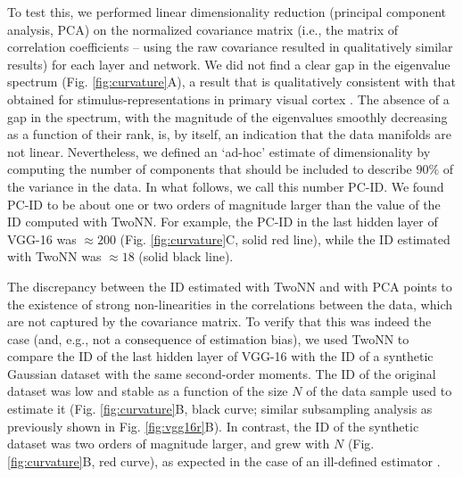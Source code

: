 \documentclass{article}
\begin{document}
To test this, we performed linear dimensionality reduction (principal component analysis, PCA) on the normalized covariance matrix (i.e., the matrix of correlation coefficients -- using the raw covariance resulted in qualitatively similar results) for each layer and network. We did not find a clear gap in the eigenvalue spectrum (Fig. \ref{fig:curvature}A), a  result that is qualitatively consistent with that obtained for stimulus-representations in primary visual cortex \cite{stringer2018high}. The absence of a gap in the spectrum, with the magnitude of the eigenvalues smoothly decreasing as a function of their rank, is, by itself, an indication that the data manifolds are not linear.
Nevertheless, we defined an `ad-hoc' estimate of dimensionality by computing the number of components that should be included to describe $90 \%$ of the variance in the data. In what follows, we call this number PC-ID. We found PC-ID to be about one or two orders of magnitude larger than the value of the ID computed with TwoNN. For example, the PC-ID in the last hidden layer of VGG-16 was $\approx 200$ (Fig. \ref{fig:curvature}C, solid red line), while the ID estimated with TwoNN was $\approx 18$ (solid black line).

The discrepancy between the ID estimated with TwoNN and with PCA points to the existence of strong non-linearities in the correlations between the data, which are not captured by the covariance matrix. To verify that this was indeed the case (and, e.g., not a consequence of estimation bias), we used TwoNN to compare the ID of the last hidden layer of VGG-16 with the ID of a synthetic Gaussian dataset with the same second-order moments. The ID of the original dataset was low and stable as a function of the size $N$ of the data sample used to estimate it (Fig. \ref{fig:curvature}B, black curve; similar subsampling analysis as previously shown in Fig. \ref{fig:vgg16r}B). In contrast, the ID of the synthetic dataset was two orders of magnitude larger, and grew with $N$ (Fig. \ref{fig:curvature}B, red curve),  as expected in the case of an ill-defined estimator \cite{facco2017estimating}. 
\end{document}
